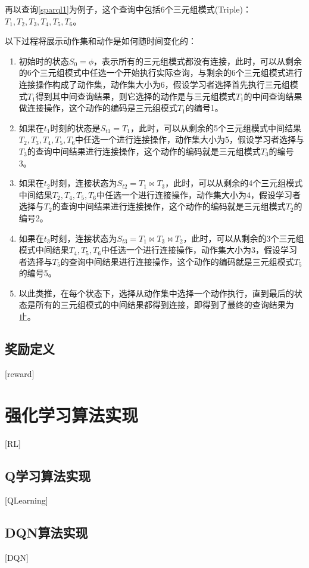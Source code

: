再以查询\ref{sparql1}为例子，这个查询中包括6个三元组模式(Triple)：$T_1, T_2, T_3, T_4, T_5, T_6$。

以下过程将展示动作集和动作是如何随时间变化的：
\begin{enumerate}
    \item 初始时的状态$S_0=\phi$，表示所有的三元组模式都没有连接，此时，可以从剩余的6个三元组模式中任选一个开始执行实际查询，与剩余的6个三元组模式进行连接操作构成了动作集，动作集大小为6，假设学习者选择首先执行三元组模式$T_1$得到其中间查询结果，则它选择的动作是与三元组模式$T_1$的中间查询结果做连接操作，这个动作的编码是三元组模式$T_1$的编号1。
    \item 如果在$t_1$时刻的状态是$S_{t1} = T_1$，此时，可以从剩余的5个三元组模式中间结果$T_2,T_3,T_4,T_5,T_6$中任选一个进行连接操作，动作集大小为5，假设学习者选择与$T_3$的查询中间结果进行连接操作，这个动作的编码就是三元组模式$T_3$的编号3。
    \item 如果在$t_2$时刻，连接状态为$S_{t2} = T_1 \Join T_3$，此时，可以从剩余的4个三元组模式中间结果$T_2,T_4,T_5,T_6$中任选一个进行连接操作，动作集大小为4，假设学习者选择与$T_2$的查询中间结果进行连接操作，这个动作的编码就是三元组模式$T_2$的编号2。
    \item 如果在$t_3$时刻，连接状态为$S_{t3} = T_1 \Join T_3 \Join T_2$，此时，可以从剩余的3个三元组模式中间结果$T_4,T_5,T_6$中任选一个进行连接操作，动作集大小为3，假设学习者选择与$T_5$的查询中间结果进行连接操作，这个动作的编码就是三元组模式$T_5$的编号5。
    \item 以此类推，在每个状态下，选择从动作集中选择一个动作执行，直到最后的状态是所有的三元组模式的中间结果都得到连接，即得到了最终的查询结果为止。
\end{enumerate}

\subsection{奖励定义}[reward]
\section{强化学习算法实现}[RL]
\subsection{Q学习算法实现}[QLearning]
\subsection{DQN算法实现}[DQN]
